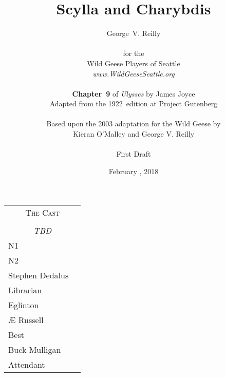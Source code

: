 


\title{\Huge Scylla and Charybdis}
\author{George~V. Reilly\\
\\
{\small for the}\\
Wild Geese Players of Seattle\\
{\textit{www.WildGeeseSeattle.org}}\\
\\
{\small \textbf{Chapter~9} of \textit{Ulysses} by James Joyce}\\
{\small Adapted from the 1922~edition at Project Gutenberg}
\\
\\
{\small Based upon the 2003 adaptation for the Wild Geese by}\\
{\small Kieran O'Malley and George V. Reilly}\\
\\
{\small First Draft}}
\date{February , 2018}
\raggedbottom



\maketitle
\thispagestyle{empty}
\pagebreak

\begin{tabular}{lp{10cm}}
    \multicolumn{2}{c}{\Large \textsc{The Cast}} \\
\\
    \multicolumn{2}{c}{\large \textit{TBD}} \\
N1 \\  %
N2 \\  %
Stephen Dedalus \\
Librarian \\
Eglinton \\
Æ Russell \\
Best \\
Buck Mulligan \\
Attendant \\
\end{tabular}

\thispagestyle{empty}
\newpage


\setcounter{page}{1}

